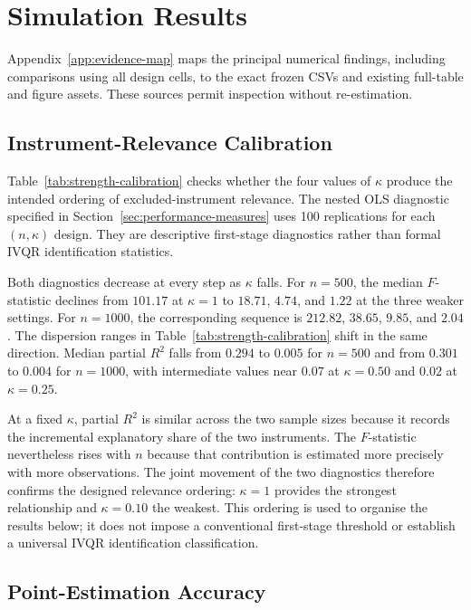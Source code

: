 \section{Simulation Results}
\label{chap:results}
Appendix~\ref{app:evidence-map} maps the principal numerical findings, including comparisons using all design cells, to the exact frozen CSVs and existing full-table and figure assets. These sources permit inspection without re-estimation.
\subsection{Instrument-Relevance Calibration}
\label{sec:results-relevance-calibration}

Table~\ref{tab:strength-calibration} checks whether the four values of $\kappa$ produce the intended ordering of excluded-instrument relevance. The nested OLS diagnostic specified in Section~\ref{sec:performance-measures} uses 100 replications for each $(n,\kappa)$ design. They are descriptive first-stage diagnostics rather than formal IVQR identification statistics.



Both diagnostics decrease at every step as $\kappa$ falls. For $n=500$, the median $F$-statistic declines from $101.17$ at $\kappa=1$ to $18.71$, $4.74$, and $1.22$ at the three weaker settings. For $n=1000$, the corresponding sequence is $212.82$, $38.65$, $9.85$, and $2.04$. The dispersion ranges in Table~\ref{tab:strength-calibration} shift in the same direction. Median partial $R^2$ falls from $0.294$ to $0.005$ for $n=500$ and from $0.301$ to $0.004$ for $n=1000$, with intermediate values near $0.07$ at $\kappa=0.50$ and $0.02$ at $\kappa=0.25$.

At a fixed $\kappa$, partial $R^2$ is similar across the two sample sizes because it records the incremental explanatory share of the two instruments. The $F$-statistic nevertheless rises with $n$ because that contribution is estimated more precisely with more observations. The joint movement of the two diagnostics therefore confirms the designed relevance ordering: $\kappa=1$ provides the strongest relationship and $\kappa=0.10$ the weakest. This ordering is used to organise the results below; it does not impose a conventional first-stage threshold or establish a universal IVQR identification classification.

\subsection{Point-Estimation Accuracy}
\label{sec:results-point-accuracy}

